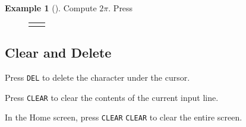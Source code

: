\documentclass[10pt,]{book}
\theoremstyle{plain}
\theoremstyle{definition}
\theoremstyle{definition}
\newtheorem{example}[theorem]{Example}
\theoremstyle{definition}
\numberwithin{equation}{part}
\newlength{\panelmax}
\begin{document}
\begin{example}[]\label{example-95}
Compute \(2\pi\). Press%
{%
\setlength{\panelmax}{0pt}
\newsavebox{\panelboxAHKp}
\newlength{\phAHKp}\setlength{\phAHKp}{\ht\panelboxAHKp+\dp\panelboxAHKp}
\settototalheight{\phAHKp}{\usebox{\panelboxAHKp}}
\setlength{\panelmax}{\maxof{\panelmax}{\phAHKp}}
\newsavebox{\panelboxAHLp}
\newlength{\phAHLp}\setlength{\phAHLp}{\ht\panelboxAHLp+\dp\panelboxAHLp}
\settototalheight{\phAHLp}{\usebox{\panelboxAHLp}}
\setlength{\panelmax}{\maxof{\panelmax}{\phAHLp}}
\leavevmode%
\setlength{\tabcolsep}{0.025\textwidth}
\begin{figure}
\begin{tabular}{@{}*{2}{c}@{}}
\begin{minipage}[c][\panelmax][t]{0.6\textwidth}\usebox{\panelboxAHKp}\end{minipage}&
\begin{minipage}[c][\panelmax][t]{0.35\textwidth}\usebox{\panelboxAHLp}\end{minipage}\end{tabular}
\end{figure}
}%
\end{example}
\typeout{************************************************}
\typeout{************************************************}
\subsection[{Clear and Delete}]{Clear and Delete}\label{subsection-66}
Press \lstinline?DEL? to delete the character under the cursor.%
\par
Press \lstinline?CLEAR? to clear the contents of the current input line.%
\par
In the Home screen, press \lstinline?CLEAR? \lstinline?CLEAR? to clear the entire screen.%
\typeout{************************************************}
\typeout{************************************************}
\end{document}
